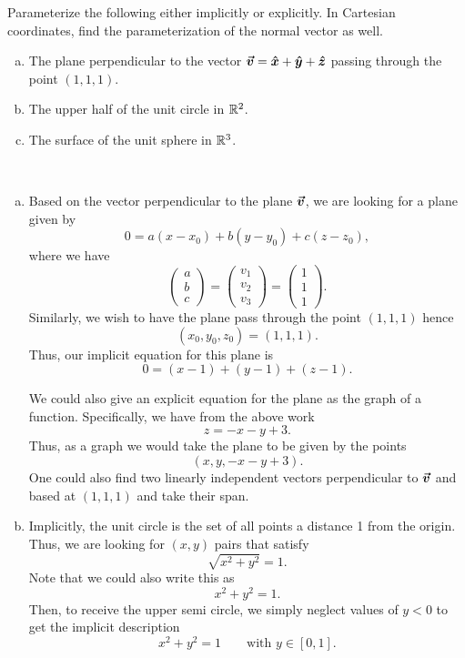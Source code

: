 \documentclass[12pt]{article} %
\begin{document}
\newpage
\begin{problem} 
Parameterize the following either implicitly or explicitly. In Cartesian coordinates, find the parameterization of the normal vector as well.
\begin{enumerate}[(a)]
	\item The plane perpendicular to the vector $\boldsymbol{\vec{v}} = \boldsymbol{\hat{x}} + \boldsymbol{\hat{y}} + \boldsymbol{\hat{z}}$ passing through the point $(1,1,1)$.
	\item The upper half of the unit circle in $\mathbb{R}^2$.
	\item The surface of the unit sphere in $\mathbb{R}^3$.
\end{enumerate}
\end{problem}
\begin{solution}~
    \begin{enumerate}[(a)]
        \item Based on the vector perpendicular to the plane $\boldsymbol{\vec{v}}$, we are looking for a plane given by
        \[
        0=a(x-x_0)+b(y-y_0)+c(z-z_0),
        \]
        where we have
        \[
        \begin{pmatrix} a \\ b \\ c \end{pmatrix} = \begin{pmatrix} v_1 \\ v_2 \\ v_3 \end{pmatrix} = \begin{pmatrix} 1 \\ 1 \\ 1 \end{pmatrix}.
        \]
        Similarly, we wish to have the plane pass through the point $(1,1,1)$ hence
        \[
        (x_0,y_0,z_0)=(1,1,1).
        \]
        Thus, our implicit equation for this plane is
        \[
        0=(x-1)+(y-1)+(z-1).
        \]
        
        We could also give an explicit equation for the plane as the graph of a function.  Specifically, we have from the above work
        \[
        z=-x-y+3.
        \]
        Thus, as a graph we would take the plane to be given by the points
        \[
        (x,y,-x-y+3).
        \]
        One could also find two linearly independent vectors perpendicular to $\boldsymbol{\vec{v}}$ and based at $(1,1,1)$ and take their span.
        
        \item Implicitly, the unit circle is the set of all points a distance 1 from the origin.  Thus, we are looking for $(x,y)$ pairs that satisfy
        \[
        \sqrt{x^2+y^2}=1.
        \]
        Note that we could also write this as
        \[
        x^2+y^2=1.
        \]
        Then, to receive the upper semi circle, we simply neglect values of $y<0$ to get the implicit description
        \[
        x^2+y^2=1 \qquad \textrm{with $y\in [0,1]$.}
        \]
        

\end{enumerate}
\end{solution}
\end{document}
